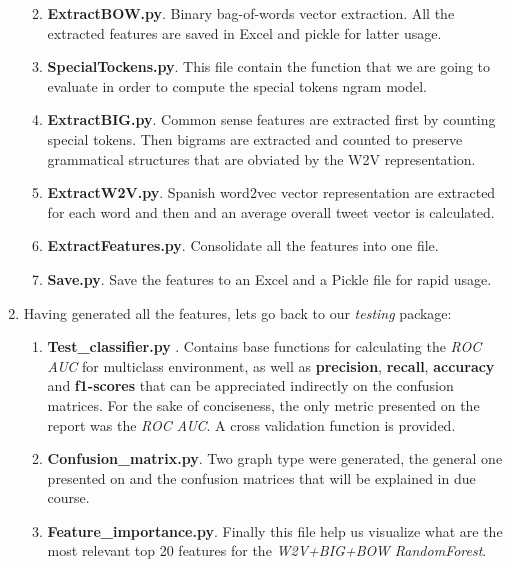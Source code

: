 \documentclass[author-year, review]{elsarticle} %
\begin{document}
\begin{enumerate}
  \begin{enumerate}
  \def\labelenumii{\alph{enumii}.}
  \item
    \textbf{ExtractBOW.py}. Binary bag-of-words vector extraction. All
    the extracted features are saved in Excel and pickle for latter
    usage.
  \item
    \textbf{SpecialTockens.py}. This file contain the function that we
    are going to evaluate in order to compute the special tokens ngram
    model.
  \item
    \textbf{ExtractBIG.py}. Common sense features are extracted first by
    counting special tokens. Then bigrams are extracted and counted to
    preserve grammatical structures that are obviated by the W2V
    representation.
  \item
    \textbf{ExtractW2V.py}. Spanish word2vec vector representation are
    extracted for each word and then and an average overall tweet vector
    is calculated.
  \item
    \textbf{ExtractFeatures.py}. Consolidate all the features into one
    file.
  \item
    \textbf{Save.py}. Save the features to an Excel and a Pickle file
    for rapid usage.
  \end{enumerate}
\item
  Having generated all the features, lets go back to our \emph{testing}
  package:

  \begin{enumerate}
  \def\labelenumii{\alph{enumii}.}
  \item
    \textbf{Test\_classifier.py} . Contains base functions for
    calculating the \emph{ROC AUC} for multiclass environment, as well
    as \textbf{precision}, \textbf{recall}, \textbf{accuracy} and
    \textbf{f1-scores} that can be appreciated indirectly on the
    confusion matrices. For the sake of conciseness, the only metric
    presented on the report was the \emph{ROC AUC}. A cross validation
    function is provided.
  \item
    \textbf{Confusion\_matrix.py}. Two graph type were generated, the
    general one presented on
    and the confusion matrices that will be explained in due course.
  \item
    \textbf{Feature\_importance.py}. Finally this file help us visualize
    what are the most relevant top 20 features for the \emph{W2V+BIG+BOW
    RandomForest}.
  \end{enumerate}
\end{enumerate}
\end{document}
